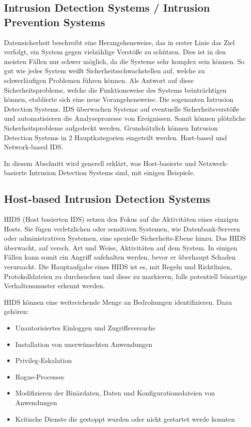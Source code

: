 \subsection{Intrusion Detection Systems / Intrusion Prevention Systems}
Datensicherheit beschreibt eine Herangehensweise, das in erster Linie das Ziel verfolgt, ein System gegen vielzählige Verstöße zu schützen. Dies ist in den meisten Fällen nur schwer möglich, da die Systeme sehr komplex sein können. So gut wie jedes System weißt Sicherheitsschwachstellen auf, welche zu schwerläufigen Problemen führen können.
Als Antwort auf diese Sicherheitsprobleme, welche die Funktionsweise des Systems beinträchtigen können, etablierte sich eine neue Vorangehensweise. Die sogenanten Intrusion Detection Systems.
IDS überwachen Systeme auf eventuelle Sicherheitsverstöße und automatisieren die Analyseprozesse von Ereignissen. Somit können plötzliche Sicherheitsprobleme aufgedeckt werden.\cite{haystack_ids}
Grundsätzlich können Intrusion Detection Systems in 2 Hauptkategorien eingeteilt werden. Host-based und Network-based IDS.\cite{IDS_Book_1}

In diesem Abschnitt wird generell erklärt, was Host-basierte und Netzwerk-basierte Intrusion Detection Systems sind, mit einigen Beispiele.

\subsection{Host-based Intrusion Detection Systems}
HIDS (Host basierten IDS) setzen den Fokus auf die Aktivitäten eines einzigen Hosts. Sie fügen verletzlichen oder sensitiven Systemen, wie Datenbank-Servern oder administrativen Systemen, eine spezielle Sicherheits-Ebene hinzu. Das HIDS überwacht, auf versch. Art und Weise, Aktivitäten auf dem System. In einigen Fällen kann somit ein Angriff aufehalten werden, bevor er überhaupt Schaden verursacht. \cite{IDS_Book_1} \cite{IDS_Book_2}
Die Hauptaufgabe eines HIDS ist es, mit Regeln und Richtlinien, Protokolldateien zu durchsuchen und diese zu markieren, falls potentiell bösartige Verhaltensmuster erkennt werden.

HIDS können eine weitreichende Menge an Bedrohungen identifizieren. Dazu gehören:\cite{hids_url_2}

\begin{itemize}
  \item Unautorisiertes Einloggen und Zugriffsversuche
  \item Installation von unerwünschten Anwendungen
  \item Privileg-Eskalation
  \item Rogue-Processes
  \item Modifizieren der Binärdaten, Daten und Konfigurationsdateien von Anwendungen
  \item Kritische Dienste die gestoppt wurden oder nicht gestartet werde konnten
\end{itemize}


